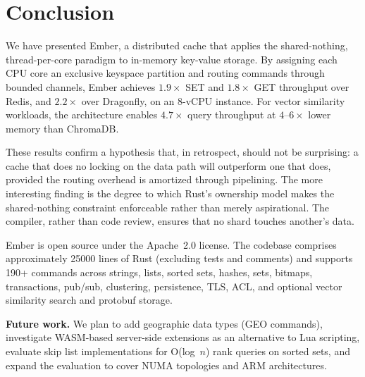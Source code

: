 \documentclass[conference]{IEEEtran}
\begin{document}
\section{Conclusion}
\label{sec:conclusion}

We have presented Ember, a distributed cache that applies the
shared-nothing, thread-per-core paradigm to in-memory key-value
storage. By assigning each CPU core an exclusive keyspace partition
and routing commands through bounded channels, Ember achieves
$1.9\times$ SET and $1.8\times$ GET throughput over Redis, and
$2.2\times$ over Dragonfly, on an 8-vCPU instance. For vector
similarity workloads, the architecture enables $4.7\times$ query
throughput at $4$--$6\times$ lower memory than ChromaDB.

These results confirm a hypothesis that, in retrospect, should not be
surprising: a cache that does no locking on the data path will
outperform one that does, provided the routing overhead is amortized
through pipelining. The more interesting finding is the degree to
which Rust's ownership model makes the shared-nothing constraint
enforceable rather than merely aspirational. The compiler, rather than
code review, ensures that no shard touches another's data.

Ember is open source under the Apache~2.0 license. The codebase
comprises approximately \num{25000} lines of Rust (excluding tests
and comments) and supports 190+ commands across strings, lists,
sorted sets, hashes, sets, bitmaps, transactions, pub/sub,
clustering, persistence, TLS, ACL, and optional vector similarity
search and protobuf storage.

\textbf{Future work.} We plan to add geographic data types (GEO
commands), investigate WASM-based server-side extensions as an
alternative to Lua scripting, evaluate skip list implementations for
O(log~$n$) rank queries on sorted sets, and expand the evaluation to
cover NUMA topologies and ARM architectures.

\balance
\end{document}
